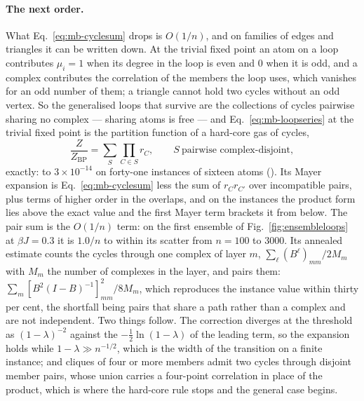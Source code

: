\paragraph{The next order.} What Eq.~\eqref{eq:mb-cyclesum} drops is
$O(1/n)$, and on families of edges and triangles it can be written down.
At the trivial fixed point an atom on a loop contributes $\mu_{i}=1$ when
its degree in the loop is even and $0$ when it is odd, and a complex
contributes the correlation of the members the loop uses, which vanishes
for an odd number of them; a triangle cannot hold two cycles without an
odd vertex. So the generalised loops that survive are the collections of
cycles pairwise sharing no complex --- sharing atoms is free --- and
Eq.~\eqref{eq:mb-loopseries} at the trivial fixed point is the partition
function of a hard-core gas of cycles,
\begin{equation}
  \frac{Z}{Z_{\mathrm{BP}}}=\sum_{S}\prod_{C\in S}r_{C},
  \qquad S\ \text{pairwise complex-disjoint},
  \label{eq:mb-hardcore}
\end{equation}
exactly: to $3\times10^{-14}$ on forty-one instances of sixteen atoms
(). Its Mayer expansion is
Eq.~\eqref{eq:mb-cyclesum} less the sum of $r_{C}r_{C'}$ over
incompatible pairs, plus terms of higher order in the overlaps, and on
the instances the product form lies above the exact value and the
first Mayer term brackets it from below. The pair sum is the $O(1/n)$
term: on the first ensemble of Fig.~\ref{fig:ensembleloops} at
$\beta J=0.3$ it is $1.0/n$ to within its scatter from $n=100$ to
$3000$. Its annealed estimate counts the cycles through one complex of
layer $m$, $\sum_{\ell}(B^{\ell})_{mm}/2M_{m}$ with $M_{m}$ the number of
complexes in the layer, and pairs them: $\sum_{m}[B^{2}(I-B)^{-1}]_{mm}^{2}/8M_{m}$,
which reproduces the instance value within thirty per cent, the
shortfall being pairs that share a path rather than a complex and are
not independent. Two things follow. The correction diverges at the
threshold as $(1-\lambda)^{-2}$ against the $-\tfrac12\ln(1-\lambda)$ of
the leading term, so the expansion holds while $1-\lambda\gg n^{-1/2}$,
which is the width of the transition on a finite instance; and cliques
of four or more members admit two cycles through disjoint member pairs,
whose union carries a four-point correlation in place of the product,
which is where the hard-core rule stops and the general case begins.

